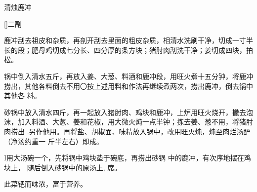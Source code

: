 \begin{recipe}{清烛鹿冲}

\ingredients

[\footnotemark]{二副}

\preparation

\step 鹿冲刮去祖皮和杂质，再剖开刮去里面的粗皮杂质，相清水洗刷干净，切成一寸半
长的段；肥母鸡切成七分长、四分厚的条方块；猪肘肉刮洗干净；姜切成四块，拍松。

\step 锅中倒入清水五斤，再放入姜、大葱、料酒和鹿冲段，用旺火煮十五分钟，将鹿冲
捞出，其他各料倒去不用〇按上述用料和作法再继续煮两次，捞出鹿冲，倒去锅中其他各
料。

\step 砂锅中放入清水四斤，再一起放入猪肘肉、鸡块和鹿冲，上炉用旺火烧开，撇去泡
沫，加入料酒、大葱、姜和花椒，用大微火炖一点半钟；拣去姜、葱不用，将猪肘肉捞出
.另作他用。再将盐、胡椒面、味精放入锅中，改用旺火炖，炖至肉烂汤酽（净汤约重一
斤半左右）即成。

I用大汤碗一个，先将锅中鸡块垫于碗底，再捞出砂锅 中的鹿冲，有次序地摆在鸡块上，
随后倒入砂锅中的原汤上, 席。

\features

此菜钯而味浓，富于营养。


\end{recipe}

